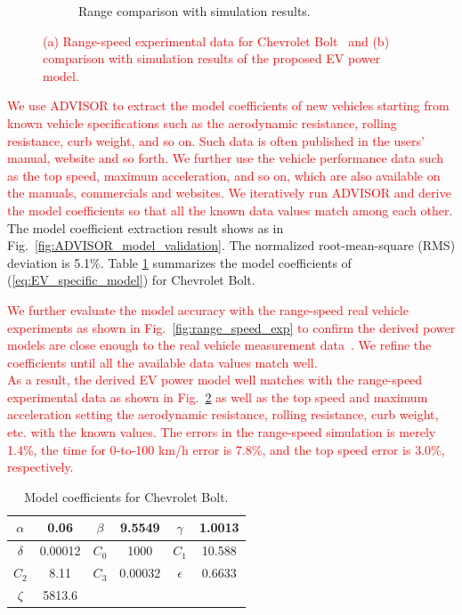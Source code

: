 \documentclass{IEEEtran}
\begin{document}
\begin{figure}
\begin{subfigure}{0.4\textwidth}
	\caption{Range comparison with simulation results.}
	\label{fig:range_speed_valid}
	\end{subfigure}
\caption{\textcolor{red}{(a) Range-speed experimental data for Chevrolet Bolt~\cite{GM_Bolt:range_speed} and (b) comparison with simulation results of the proposed EV power model.}}
\end{figure}

\textcolor{red}{We use ADVISOR to extract the model coefficients of new vehicles starting from known vehicle specifications such as the aerodynamic resistance, rolling resistance, curb weight, and so on. Such data is often published in the users' manual, website and so forth. We further use the vehicle performance data such as the top speed, maximum acceleration, and so on, which are also available on the manuals, commercials and websites. We iteratively run ADVISOR and derive the model coefficients so that all the known data values match among each other.}
The model coefficient extraction result shows as in Fig.~\ref{fig:ADVISOR_model_validation}. The normalized root-mean-square (RMS) deviation is 5.1\%. Table \ref{table:Coeff_Bolt} summarizes the model coefficients of (\ref{eq:EV_specific_model}) for Chevrolet Bolt. 

\textcolor{red}{We further evaluate the model accuracy with the range-speed real vehicle experiments as shown in Fig.~\ref{fig:range_speed_exp} to confirm the derived power models are close enough to the real vehicle measurement data~\cite{GM_Bolt:range25mph,GM_Bolt:range65mph,GM_Bolt:range75mph,GM_Bolt:range93mph,GM_Bolt:range_speed}. We  refine the coefficients until all the available data values match well. \\
As a result, the derived EV power model well matches with the range-speed experimental data as shown in Fig.~\ref{fig:range_speed_valid} as well as the top speed and maximum acceleration setting the aerodynamic resistance, rolling resistance, curb weight, etc. with the known values. The errors in the range-speed simulation is merely 1.4\%, the time for 0-to-100 km/h error is 7.8\%, and the top speed error is 3.0\%, respectively.} 

\begin{table}
\caption{Model coefficients for Chevrolet Bolt.}
\label{table:Coeff_Bolt}
\centering
\begin{tabular}{|c|c|c|c|c|c|}  \hline
$\alpha$	&0.06		&$\beta$	&9.5549	&$\gamma$	&1.0013	\\ \hline
$\delta$	&0.00012 		&$C_0$	&1000 	&$C_1$		&10.588	\\ \hline
$C_2$	&8.11		&$C_3$	&0.00032	&$\epsilon$	&0.6633	\\ \hline
$\zeta$	&5813.6		\\ \cline{1-2}
\end{tabular}
\end{table}
\end{document}

